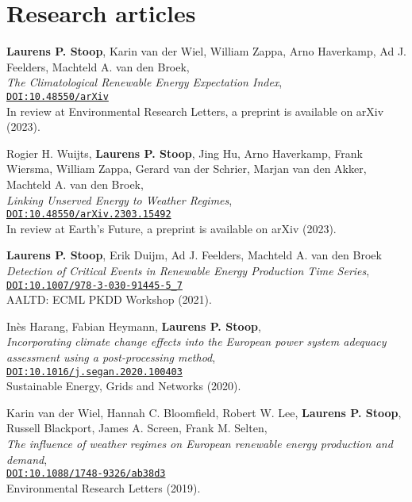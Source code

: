 \section*{Research articles}
\begin{etaremune}{\small

\item \textbf{Laurens P. Stoop}\ts{\Writinghand, \Letter}, Karin van der Wiel, William Zappa, Arno Haverkamp, Ad J. Feelders, Machteld A. van den Broek, \\
\textit{The Climatological Renewable Energy Expectation Index}, \\
\texttt{\href{https://doi.org/10.48550/arXiv.}{DOI:10.48550/arXiv}} \\
In review at Environmental Research Letters, a preprint is available on arXiv (2023).

\item Rogier H. Wuijts\ts{\Writinghand}, \textbf{Laurens P. Stoop}\ts{\Writinghand, \Letter}, Jing Hu, Arno Haverkamp, Frank Wiersma, William Zappa, Gerard van der Schrier, Marjan van den Akker, Machteld A. van den Broek, \\
\textit{Linking Unserved Energy to Weather Regimes}, \\
\texttt{\href{https://doi.org/10.48550/arXiv.2303.15492}{DOI:10.48550/arXiv.2303.15492}} \\
In review at Earth's Future, a preprint is available on arXiv (2023).

\item \textbf{Laurens P. Stoop}\ts{\Letter}, Erik Duijm, Ad J. Feelders, Machteld A. van den Broek \\
\textit{Detection of Critical Events in Renewable Energy Production Time Series}, \\
\texttt{\href{https://doi.org/10.1007/978-3-030-91445-5_7}{DOI:10.1007/978-3-030-91445-5\_7}} \\
AALTD: ECML PKDD Workshop (2021).

\item Inès Harang, Fabian Heymann, \textbf{Laurens P. Stoop}\ts{\Letter}, \\
\textit{Incorporating climate change effects into the European power system adequacy assessment using a post-processing method}, \\
\texttt{\href{https://doi.org/10.1016/j.segan.2020.100403}{DOI:10.1016/j.segan.2020.100403}} \\
Sustainable Energy, Grids and Networks (2020).

\item Karin van der Wiel\ts{\Letter}, Hannah C. Bloomfield, Robert W. Lee, \textbf{Laurens P. Stoop}, Russell Blackport, James A. Screen, Frank M. Selten, \\
\textit{The influence of weather regimes on European renewable energy production and demand}, \\
\texttt{\href{https://doi.org/10.1088/1748-9326/ab38d3}{DOI:10.1088/1748-9326/ab38d3}} \\
Environmental Research Letters (2019).

}
\end{etaremune}
